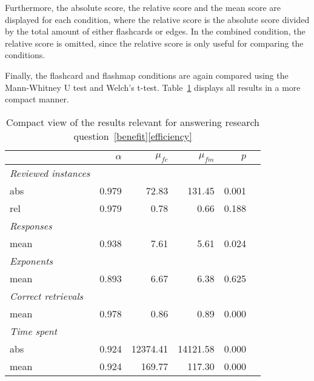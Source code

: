 Furthermore, the absolute score, the relative score and the mean score are displayed for each condition, where the relative score is the absolute score divided by the total amount of either flashcards or edges. In the combined condition, the relative score is omitted, since the relative score is only useful for comparing the conditions. 

Finally, the flashcard and flashmap conditions are again compared using the Mann-Whitney U test and Welch's t-test. Table~\ref{tab:efficiency} displays all results in a more compact manner.

\begin{table}
    \centering
    \begin{tabular}{lrrrrr}
        \toprule
        & $\alpha$ & $\mu_{fc}$ & $\mu_{fm}$ & $p$ \\
        \midrule
        \emph{Reviewed instances} &&&& \\
        \midrule
        abs & 0.979 & 72.83 & 131.45 & 0.001 \\
        rel & 0.979 & 0.78 & 0.66 & 0.188 \\
        \midrule
        \emph{Responses} &&&& \\
        \midrule
        mean & 0.938 & 7.61 & 5.61 & 0.024 \\
        \midrule
        \multicolumn{5}{l}{\emph{Exponents}} \\
        \midrule
        mean & 0.893 & 6.67 & 6.38 & 0.625 \\
        \midrule
        \emph{Correct retrievals} &&&& \\
        \midrule
        mean & 0.978 & 0.86 & 0.89 & 0.000 \\
        \midrule
        \emph{Time spent} &&&& \\
        \midrule
        abs & 0.924 & 12374.41 & 14121.58 & 0.000 \\
        mean & 0.924 & 169.77 & 117.30 & 0.000 \\
        \bottomrule
    \end{tabular}
    \caption{Compact view of the results relevant for answering research question~\protect\ref{benefit}\protect\ref{efficiency}}
    \label{tab:efficiency}
\end{table}

